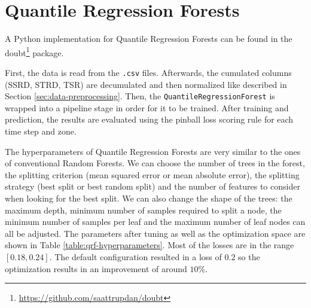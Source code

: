 \section{Quantile Regression Forests}
\label{sec:implementation-qrf}

A Python implementation for Quantile Regression Forests can 
be found in the doubt\footnote{\url{https://github.com/saattrupdan/doubt}} package.

First, the data is read from the \texttt{.csv} files. 
Afterwards, the cumulated columns (SSRD, STRD, TSR) are decumulated and then normalized 
like described in Section \ref{sec:data-preprocessing}.
Then, the \texttt{QuantileRegressionForest} is wrapped into a pipeline stage in order for 
it to be trained.
After training and prediction, the results are evaluated 
using the pinball loss scoring rule for each time step and zone.

The hyperparameters of Quantile Regression Forests are very similar to the ones 
of conventional Random Forests. We can choose the number of trees in the forest, 
the splitting criterion (mean squared error or mean absolute error), 
the splitting strategy (best split or best random split) 
and the number of features to consider when looking for the best split. 
We can also change the shape of the trees: 
the maximum depth, minimum number of samples required to split a node, the minimum number of samples per leaf and 
the maximum number of leaf nodes can all be adjusted.
The parameters after tuning as well as the optimization space 
are shown in Table \ref{table:qrf-hyperparameters}.
Most of the losses are in the range \([0.18, 0.24]\). 
The default configuration resulted in a loss of \(0.2\) so 
the optimization results in an improvement of around \(10\%\).

